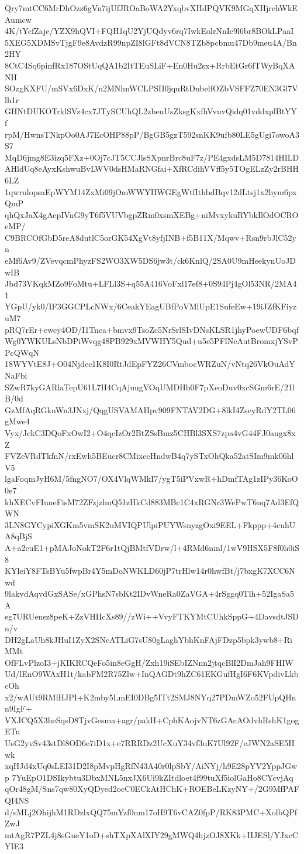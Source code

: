Qry7mtCC6MrDhOzz6gVu7ijUfJROaBoWA2YxqbvXHdPQVK9MGqXHjrehWkEAumcw
4K/tYcfZaje/YZX9hQVI+FQH1qU2YjUQdyv6rq7IwkEolrNnIc9l6br8BOkLPaaI
5XEG5XDMSvTjgF9e8AvdzR99npZI8lGFt8dVCN8TZb8pcbmu47Db9meu4A/Bn2HY
8CtC4Sq6pinfRx187OStUqQA1b2ItTEuSLiF+En0Hu2sx+RrbEtGr6fTWyBqXANH
SOzgKXFU/mSVx6DxK/n2MNhnWCLPSII0jquRtDnbelfOZbVSFFZ70EN3Gl7Vlh1r
GHNtDUKOTrklSVz4cx7JTySCUhQL2zbeuUsZksgKxfhVvnvQidq01vddxplBtYYf
rpM/HwnsTNkpOo0AJ7EcOHP88pP/BgGB5gzT592snKK9ufb80LE5gUgi7owoA3S7
MqD6jmg8E3izq5FXz+0Oj7cJT5CCJlsSXpnrBrc8uF7z/PE4gxdsLM5D7814HILD
AHldUq8eAyxKshwuBvLWV0dsHMaRNGfai+XfRCdihVVff5y5TOgELzZy2rBHH6LZ
1qwrulopsaEpWYM14ZxMi09jOmWWYHWGEgWtfIthbdBqv12dLtsj1x2hym6pxQmP
qhQxJaX4gAepIVnG9yT6f5VUVbgpZRm0xsmXEBg+niMvxykuRYbkIlOdOCROeMP/
C9BRCOfGbD5reA8dutlC5orGK54XgVt8yfjINB+f5B11X/Mqwv+Rsn9rbJlC52yn
eMf6Av9/ZVevqcmPhyzFS2WO3XW5DS6jw3t/ck6KnlQ/2SA0U9mHeekynUoJDwIB
Jbd73VKqkMZo9FoMtu+LFLl3S+q55A416VoFxl17ef8+0S94Pj4gOl53NR/2MA41
YGpU/yk0/IF3GGCPLcNWx/6CeakYEagUBfPoVMlUpE1SufeEw+19iJZfKFiyzuM7
pRQ7rEr+ewey4OD/I1Tnea+bmvx9TsoZc5NrSrlSIvDNsKLSR1jhyPoewUDF6bqf
Wg0YWKULsNbDPiWvqg48PB929xMVWHY5Qud+u5e5PFlNeAutBromxjYSvPPcQWqN
18WYVtE8J+O04Njdec1K8I0RtJdEpFYZ26CVmbocWRZuN/vNtq26VkOuAdYNaFbi
SZwR7kyGARlaTepU61L7H4CqAjuugVOqUMDHb0F7pXeoDuv0xcSGm6rE/21lB/0d
GzMfAqRGknWn3JNxj/QqgUSVAMAHpv909FNTAV2DG+8lkI4ZseyRdY2TL06gMwe4
Vyx/JckC3DQoFxOwI2+O4qcIzOr2BtZSsBmz5CHBl3SXS7zpa4vG44FJ0augx8xZ
FVZeVRdTkfnN/rxEwh5BEucr8CMixecHndwB4q7ySTxOhQka52atSIm9mk06hlV5
lgaFoqmJyH6M/5fngNO7/OX4VlqWMkI7/ygT5iPVxwR+hDmfTAg1zIPy36KoO0e7
khXECvFIuneFisM72ZFzjzhnQ51zHkCd883MBc1C4xRGNr3WePwT6nq7Ad3EfQWN
3LN8GYCypiXGKm5vmSK2uMVIQPUlpiPUYWsnyzgOxi9EEL+Fkppp+4cuhUA8qBjS
A+a2cuE1+pMAJoNokT2F6r1tQjBMtfVDrw/l+4RMd6ninl/1wV9HSX5F8f0h0iS8
KYleiY8FTsBYu5fwpBr4Y5mDoNWKLD60jP7trHlw14r0hwfBt/j7bxgK7XCC6Nwd
9lakvdAqvdGxSASe/xGPhsN7sbKt2IDvWneRa0ZaVGA+4rSggq0Tlh+52IgaSa5A
eg7URUensz8peK+ZzVHIIcXs89//zWi++VvyFTKYMtCUhkSppG+4DavsdtJSDn/v
DH2gLaUh8kJHuI1ZyX2SNeATLiG7sU80gLaghYbhKnFAjFDzp5bpk3ywb8+RiMMt
OfFLvPlzoI3+jKIKRCQeFo5in8eGgH/Zxh19iSEbIZNnn2jtqcBlI2DmJah9FHIW
Ud/lEnO9WAxH1t/kabFM2R75Zlw+InQAGDt9hZC61EKGufHgI6F6KVpdivLkbcOh
x2/wAUt9RMlHJPI+K2mby5LmEI0DBg5ITt2SMJ8NYq27PDmWZo52FUpQHnn9IgF+
VXJCQ5X3heSqsD8TjvGesma+agr/pakH+CphKAojvNT6zGAcAOdvhRshK1gogETu
UsG2yvSv43stDl8OD6e7iD1x+e7RRRDz2UcXuY34vf3uK7Ul92F/eJWN2aSE5Hwk
xqHJd4xUq0sLEI31D2I8pMvpHgRfN43A40r0lpSbY/AiNYj/h9E28pYV2YppJGwp
7YuEpO1DSIkybtu3DbxMNL5nxJX6Ui9kZItdloet4f99tuXf5iolGaHo8CYcvjAq
qOr48gM/Sns7qw80XyQDyed2oeC0ECkAtHChK+ROEBeLKzyNY+/2G9MfPAFQI4NS
d/sMLj2OhijhM1RDzlxQQ75mYzf0nm17oH9T6vCAZ0fpP/RK83PMC+XolbQPfZwJ
mtAgR7PZL4j8sGueY1oD+shTXpXAlXIY29gMWQ4hjzOJ8XKk+HJESl/YJxcCYIE3
